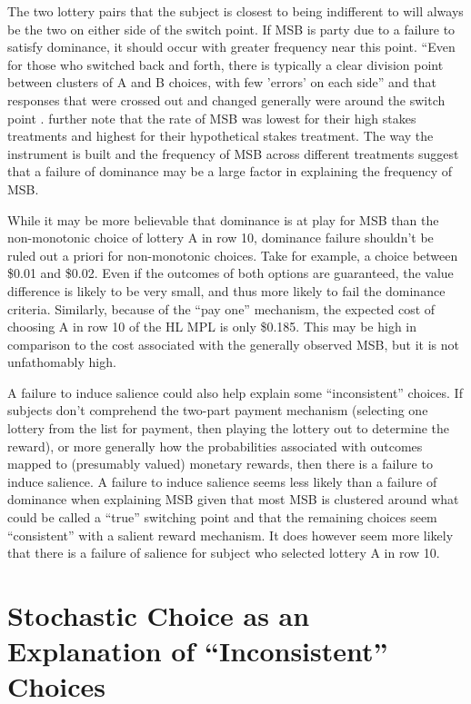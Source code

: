 \documentclass[../main.tex]{subfiles}
\begin{document}
The two lottery pairs that the subject is closest to being indifferent to will always be the two on either side of the switch point.
If MSB is party due to a failure to satisfy dominance, it should occur with greater frequency near this point.
\textcite[1648]{Holt2002} \enquote{Even for those who switched back and forth, there is typically a clear division point between clusters of A and B choices, with few 'errors' on each side} and that responses that were crossed out and changed generally were around the switch point \parencite*[1646]{Holt2002}.
\textcite[1647-1648]{Holt2002} further note that the rate of MSB was lowest for their high stakes treatments and highest for their hypothetical stakes treatment.
The way the instrument is built and the frequency of MSB across different treatments suggest that a failure of dominance may be a large factor in explaining the frequency of MSB.

While it may be more believable that dominance is at play for MSB than the non-monotonic choice of lottery A in row 10, dominance failure shouldn't be ruled out a priori for non-monotonic choices.
Take for example, a choice between \$0.01 and \$0.02.
Even if the outcomes of both options are guaranteed, the value difference is likely to be very small, and thus more likely to fail the dominance criteria.
Similarly, because of the \enquote{pay one} mechanism, the expected cost of choosing A in row 10 of the HL MPL is only \$0.185.
This may be high in comparison to the cost associated with the generally observed MSB, but it is not unfathomably high.

A failure to induce salience could also help explain some \enquote{inconsistent} choices.
If subjects don't comprehend the two-part payment mechanism (selecting one lottery from the list for payment, then playing the lottery out to determine the reward), or more generally how the probabilities associated with outcomes mapped to (presumably valued) monetary rewards, then there is a failure to induce salience.
A failure to induce salience seems less likely than a failure of dominance when explaining MSB given that most MSB is clustered around what could be called a \enquote{true} switching point and that the remaining choices seem \enquote{consistent} with a salient reward mechanism.
It does however seem more likely that there is a failure of salience for subject who selected lottery A in row 10.

\section{Stochastic Choice as an Explanation of \enquote{Inconsistent} Choices}
\end{document}
